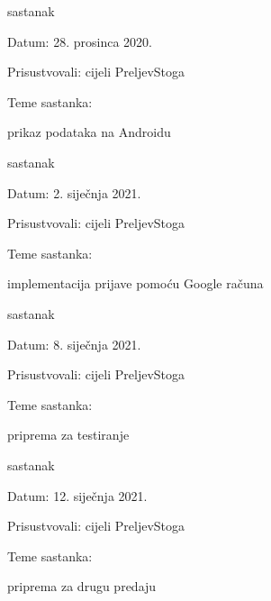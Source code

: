 \begin{packed_enum}
			\item  sastanak
			\item[] \begin{packed_item}
				\item Datum: 28. prosinca 2020.
				\item Prisustvovali: cijeli PreljevStoga
				\item Teme sastanka:
				\begin{packed_item}
					\item  prikaz podataka na Androidu
				\end{packed_item}
			\end{packed_item}
			
			\item  sastanak
			\item[] \begin{packed_item}
				\item Datum: 2. siječnja 2021.
				\item Prisustvovali: cijeli PreljevStoga
				\item Teme sastanka:
				\begin{packed_item}
					\item  implementacija prijave pomoću Google računa
				\end{packed_item}
			\end{packed_item}
			
			\item  sastanak
			\item[] \begin{packed_item}
				\item Datum: 8. siječnja 2021.
				\item Prisustvovali: cijeli PreljevStoga
				\item Teme sastanka:
				\begin{packed_item}
					\item  priprema za testiranje
				\end{packed_item}
			\end{packed_item}
			
			\item  sastanak
			\item[] \begin{packed_item}
				\item Datum: 12. siječnja 2021.
				\item Prisustvovali: cijeli PreljevStoga
				\item Teme sastanka:
				\begin{packed_item}
					\item  priprema za drugu predaju
				\end{packed_item}
			\end{packed_item}
			
			
		\end{packed_enum}
		

